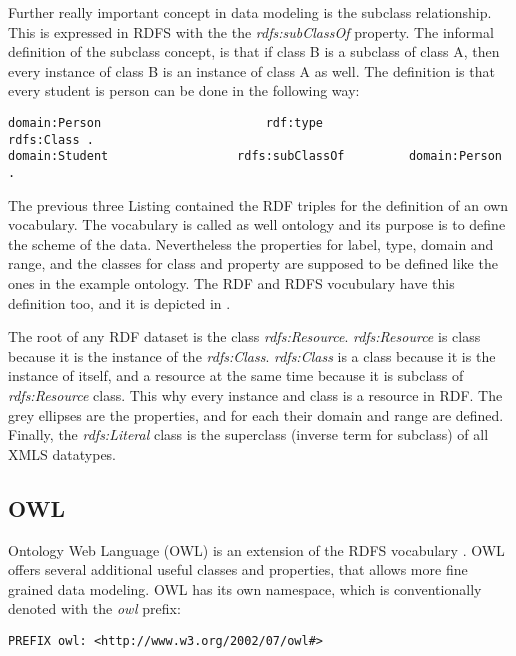Further really important concept in data modeling is the subclass relationship. This is expressed in RDFS with the the \textit{rdfs:subClassOf} property. The informal definition of the subclass concept, is that if class B is a subclass of class A, then every instance of class B is an instance of class A as well. The definition is that every student is person can be done in the following way:

\begin{lstlisting}[basicstyle=\footnotesize, captionpos=b, caption=Sub class definition, label=lst:sparql,  belowskip=1em, aboveskip=2em,
frame=single]
domain:Person						rdf:type						rdfs:Class .
domain:Student					rdfs:subClassOf			domain:Person .
\end{lstlisting}

The previous three Listing contained the RDF triples for the definition of an own vocabulary. The vocabulary is called as well ontology and its purpose is to define the scheme of the data. Nevertheless the properties for label, type, domain and range, and the classes for class and property are supposed to be defined like the ones in the example ontology. The RDF and RDFS vocubulary have this definition too, and it is depicted in .


The root of any RDF dataset is the class \textit{rdfs:Resource}.  \textit{rdfs:Resource} is class because it is the instance of the \textit{rdfs:Class}. \textit{rdfs:Class} is a class because it is the instance of itself, and a resource at the same time because it is subclass of \textit{rdfs:Resource} class. This why every instance and class is a resource in RDF. The grey ellipses are the properties, and for each their domain and range are defined. Finally, the \textit{rdfs:Literal} class is the superclass (inverse term for subclass) of all XMLS datatypes.

\subsection{OWL}

Ontology Web Language (OWL) is an extension of the RDFS vocabulary \cite{Dean:04:OWO}. OWL offers several additional useful classes and properties, that allows more fine grained data modeling. OWL has its own namespace, which is conventionally denoted with the \textit{owl} prefix:

\begin{lstlisting}[basicstyle=\footnotesize, captionpos=b, caption=OWL namespace, label=lst:sparql, belowskip=1em, aboveskip=2em,
frame=single]
PREFIX owl: <http://www.w3.org/2002/07/owl#>
\end{lstlisting}

